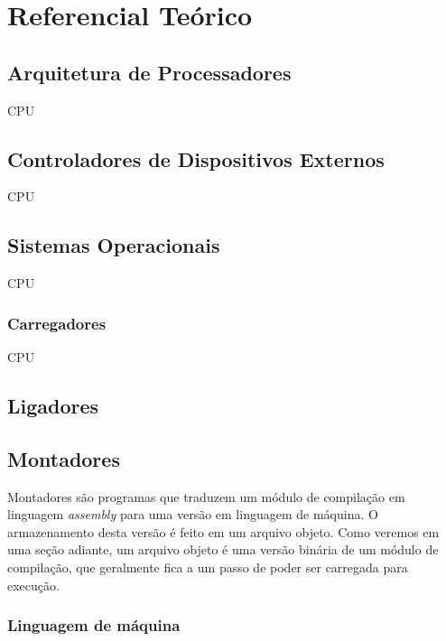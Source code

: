 
\chapter{Referencial Teórico}

\section{Arquitetura de Processadores}

CPU

\section{Controladores de Dispositivos Externos}

CPU

\section{Sistemas Operacionais}

CPU

\subsection{Carregadores}

CPU

\section{Ligadores}




\section{Montadores}

Montadores são programas que traduzem um módulo de compilação em linguagem \textit{assembly} para uma versão em linguagem de máquina. O armazenamento desta versão é feito em um arquivo objeto. Como veremos em uma seção adiante, um arquivo objeto é uma versão binária de um módulo de compilação, que geralmente fica a um passo de poder ser carregada para execução.

\subsection{Linguagem de máquina}

